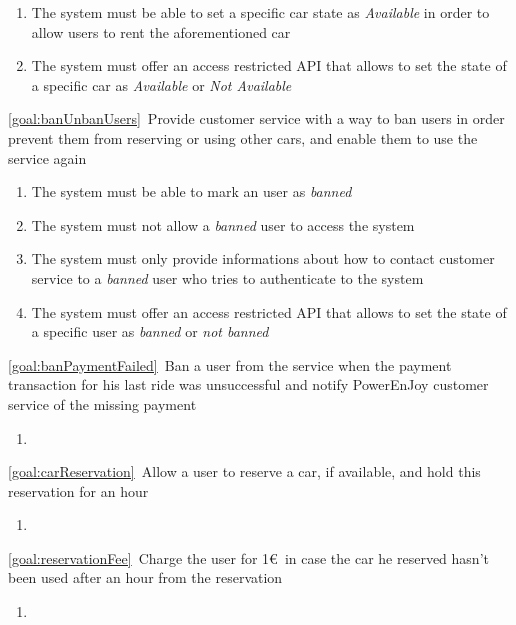 \begin{description}
\begin{enumerate}[label=\textbf{R\arabic*}]
   				\item The system must be able to set a specific car state as \textit{Available} in order to
   				allow users to rent the aforementioned car
   				\item The system must offer an access restricted API that allows to set the state of a
   				specific car as \textit{Available} or \textit{Not Available}
  			\end{enumerate}
  		\item \ref{goal:banUnbanUsers}\ Provide customer service with a way to ban users in order
  		prevent them from reserving or using other cars, and enable them to use the service again
  			\begin{enumerate}[label=\textbf{R\arabic*}]
  				\item The system must be able to mark an user as \textit{banned}
  				\item The system must not allow a \textit{banned} user to access the system
   				\item The system must only provide informations about how to contact customer service
   				to a \textit{banned} user who tries to authenticate to the system
   				\item The system must offer an access restricted API that allows to set the state of a
   				specific user as \textit{banned} or \textit{not banned}
   			\end{enumerate}
  		\item \ref{goal:banPaymentFailed}\ Ban a user from the service when the payment transaction
  		for his last ride was unsuccessful and notify PowerEnJoy customer service of the missing
  		payment
  			\begin{enumerate}[label=\textbf{R\arabic*}]
  				\item
  			\end{enumerate}
 	  	\item \ref{goal:carReservation}\ Allow a user to reserve a car, if available, and hold this
 	  	reservation for an hour
 	  		\begin{enumerate}[label=\textbf{R\arabic*}]
 	  			\item
   			\end{enumerate}
  		\item \ref{goal:reservationFee}\ Charge the user for 1\euro\ in case the car he reserved hasn't
  		been used after an hour from the reservation
  			\begin{enumerate}[label=\textbf{R\arabic*}]
  				\item

\end{enumerate}
\end{description}
